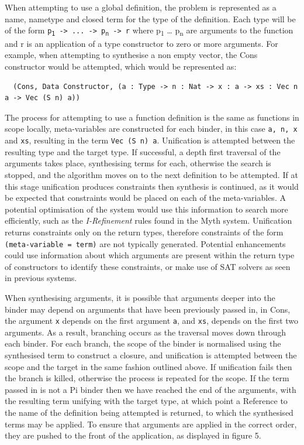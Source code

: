 \documentclass[a4paper]{article}
\begin{document}
When attempting to use a global definition, the problem is represented as a
name, nametype and closed term for the type of the definition. Each type will be of the form
\texttt{p\textsubscript{1} -> ... -> p\textsubscript{n} -> r} where p\textsubscript{1} \ldots{} p\textsubscript{n} are 
arguments to the function and r is an application of a type constructor
to zero or more arguments. For example, when attempting to synthesise a non empty vector,
the Cons constructor would be attempted, which would be represented as:

\begin{center}
\begin{verbatim}
  (Cons, Data Constructor, (a : Type -> n : Nat -> x : a -> xs : Vec n a -> Vec (S n) a))
\end{verbatim}
\end{center}

The process for attempting to use a function definition is the same as functions in scope locally,
meta-variables are constructed for each binder, in this case \texttt{a, n, x} and \texttt{xs},
resulting in the term \texttt{Vec (S n) a}.
Unification is attempted between the resulting type and the target type. If 
successful, a depth first traversal of the arguments takes place, synthesising terms for 
each, otherwise the search is stopped, and the algorithm
moves on to the next definition to be attempted. If at this stage unification
produces constraints then synthesis is continued, as it would be expected that
constraints would be placed on each of the meta-variables. A potential optimisation of
the system would use this information to search more efficiently, such as the \textit{I-Refinement}
rules found in the Myth system. Unification returns constraints only on the return types, therefore 
constraints of the form \texttt{(meta-variable = term)} are not typically generated. Potential enhancements
could use information about which arguments are present within the return type of constructors to identify
these constraints, or make use of SAT solvers as seen in previous systems. 

When synthesising arguments, it is possible that arguments deeper into the binder
may depend on arguments that have been previously passed in, in Cons, the argument \texttt{x}
depends on the first argument \texttt{a}, and \texttt{xs}, depends on the first two arguments.
As a result, branching occurs as the traversal moves down through each binder. For each branch, the scope of the binder
is normalised using the synthesised term to construct a closure, and unification is 
attempted between the scope and the target in the same fashion outlined above. 
If unification fails then the branch is killed, otherwise the process is repeated for the 
scope. If the term passed in is not a Pi binder then we have reached the end of the 
arguments, with the resulting term unifying with the target type, at which point a
Reference to the name of the definition being attempted is returned, to which the synthesised terms may be applied. To ensure that arguments
are applied in the correct order, they are pushed to the front of
the application, as displayed in figure 5.
\end{document}
